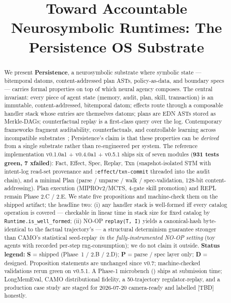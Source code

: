 \documentclass[anon]{nesy2026}   %
\title[Persistence OS]{Toward Accountable Neurosymbolic Runtimes: The Persistence OS Substrate}
\newcommand{\C}[1]{\texttt{#1}}
\begin{document}
\maketitle


\begin{abstract}
We present \textbf{Persistence}, a neurosymbolic substrate where symbolic state --- bitemporal datoms, content-addressed plan ASTs, policy-as-data, and boundary specs --- carries formal properties on top of which neural agency composes. The central invariant: every piece of agent state (memory, audit, plan, skill, transaction) is an immutable, content-addressed, bitemporal datom; effects route through a composable handler stack whose entries are themselves datoms; plans are EDN ASTs stored as Merkle-DAGs; counterfactual replay is a first-class query over the log. Contemporary frameworks fragment auditability, counterfactuals, and controllable learning across incompatible substrates~\citep{kurtic2025zep,cheng2025pangolin,khattab2023dspy,wang2023voyager,anon2026camo}; Persistence's claim is that these properties can be \emph{derived} from a single substrate rather than re-engineered per system. The reference implementation v0.1.0a1 + v0.4.0a1 + v0.5.1 ships six of seven modules (\textbf{931 tests green, 7 xfailed}): Fact, Effect, Spec, Replay, Txn (snapshot-isolated STM with intent-log read-set provenance and \C{:effect/txn-commit} threaded into the audit chain), and a minimal Plan (parse / unparse / walk / spec-validation, 128-bit content-addressing). Plan execution (MIPROv2/MCTS, 4-gate skill promotion) and REPL remain Phase 2.C / 2.E. We state five propositions and machine-check them on the shipped artifact; the headline two: (i) any handler stack is well-formed iff every catalog operation is covered --- checkable in linear time in stack size for fixed catalog by \C{Runtime.is\_well\_formed}; (ii) NO-OP \C{replay(T, I)} yields a canonical-hash byte-identical to the factual trajectory's --- a structural determinism guarantee stronger than CAMO's statistical seed-replay \emph{in the fully-instrumented NO-OP setting} (toy agents with recorded per-step rng-consumption); we do not claim it outside. \textbf{Status legend:} \textbf{S} = shipped (Phase~1 / 2.B / 2.D); \textbf{P} = parse / spec layer only; \textbf{D} = designed. Proposition statements are unchanged since v0.7; machine-checked validations rerun green on v0.5.1. A Phase-1 microbench () ships at submission time; LongMemEval, CAMO distributional fidelity, a 50-trajectory regulator-replay, and a production case study are staged for 2026-07-20 camera-ready and labelled [TBD] honestly.
\end{abstract}
\end{document}
